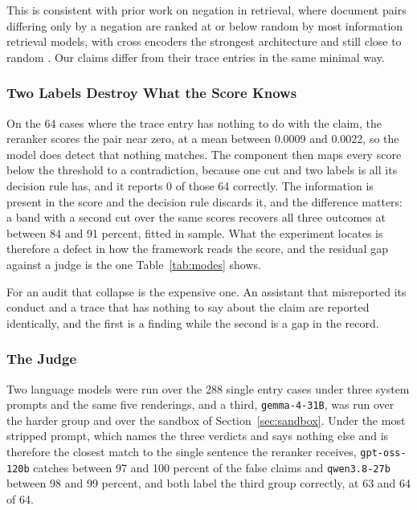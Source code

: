 \documentclass[11pt,a4paper]{article}
\begin{document}
This is consistent with prior work on negation in retrieval, where document pairs
differing only by a negation are ranked at or below random by most information
retrieval models, with cross encoders the strongest architecture and still close to
random \citep{weller2024nevir}. Our claims differ from their trace entries in the same
minimal way.

\subsubsection{Two Labels Destroy What the Score Knows}
\label{sec:threelabels}

On the 64 cases where the trace entry has nothing to do with the claim, the reranker
scores the pair near zero, at a mean between 0.0009 and 0.0022, so the model does detect
that nothing matches. The component then maps every score below the threshold to a
contradiction, because one cut and two labels is all its decision rule has, and it
reports 0 of those 64 correctly. The information is present in the score and the
decision rule discards it, and the difference matters: a band with a second cut over
the same scores recovers all three outcomes at between 84 and 91 percent, fitted in
sample. What the experiment locates is therefore a defect in how the framework reads
the score, and the residual gap against a judge is the one Table~\ref{tab:modes}
shows.

For an audit that collapse is the expensive one. An assistant that misreported its
conduct and a trace that has nothing to say about the claim are reported identically,
and the first is a finding while the second is a gap in the record.

\subsubsection{The Judge}

Two language models were run over the 288 single entry cases under three system
prompts and the same five renderings, and a third, \texttt{gemma-4-31B}, was run over
the harder group and over the sandbox of Section~\ref{sec:sandbox}. Under the most stripped prompt, which names the three
verdicts and says nothing else and is therefore the closest match to the single
sentence the reranker receives, \texttt{gpt-oss-120b} catches between 97 and 100
percent of the false claims and \texttt{qwen3.8-27b} between 98 and 99 percent, and
both label the third group correctly, at 63 and 64 of 64.
\end{document}
